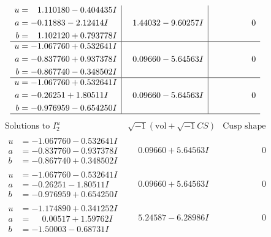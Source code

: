 \documentclass[1p]{elsarticle_modified}
\theoremstyle{definition}
\newcommand{\I}{\sqrt{-1}}
\begin{document}
$$\begin{array}{c|c|c}
\begin{aligned}
u &= \phantom{-}1.110180 - 0.404435 I \\
a &= -0.11883 - 2.12414 I \\
b &= \phantom{-}1.102120 + 0.793778 I\end{aligned}
 & \phantom{-}1.44032 - 9.60257 I & \phantom{-0.000000 } 0 \\ \hline\begin{aligned}
u &= -1.067760 + 0.532641 I \\
a &= -0.837760 + 0.937378 I \\
b &= -0.867740 - 0.348502 I\end{aligned}
 & \phantom{-}0.09660 - 5.64563 I & \phantom{-0.000000 } 0 \\ \hline\begin{aligned}
u &= -1.067760 + 0.532641 I \\
a &= -0.26251 + 1.80511 I \\
b &= -0.976959 - 0.654250 I\end{aligned}
 & \phantom{-}0.09660 - 5.64563 I & \phantom{-0.000000 } 0\\
 \hline 
 \end{array}$$\newpage$$\begin{array}{c|c|c}  
\text{Solutions to }I^u_{2}& \I (\text{vol} + \sqrt{-1}CS) & \text{Cusp shape}\\
 \hline 
\begin{aligned}
u &= -1.067760 - 0.532641 I \\
a &= -0.837760 - 0.937378 I \\
b &= -0.867740 + 0.348502 I\end{aligned}
 & \phantom{-}0.09660 + 5.64563 I & \phantom{-0.000000 } 0 \\ \hline\begin{aligned}
u &= -1.067760 - 0.532641 I \\
a &= -0.26251 - 1.80511 I \\
b &= -0.976959 + 0.654250 I\end{aligned}
 & \phantom{-}0.09660 + 5.64563 I & \phantom{-0.000000 } 0 \\ \hline\begin{aligned}
u &= -1.174890 + 0.341252 I \\
a &= \phantom{-}0.00517 + 1.59762 I \\
b &= -1.50003 - 0.68731 I\end{aligned}
 & \phantom{-}5.24587 - 6.28986 I & \phantom{-0.000000 } 0 \\ \hline\begin{aligned}

\end{aligned}
\end{array}$$
\end{document}
